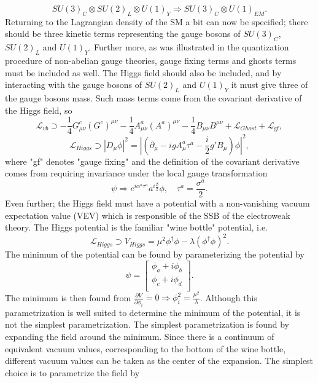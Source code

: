 \begin{equation}
	SU(3)_{C}\otimes SU(2)_L\otimes U(1)_Y\Rightarrow SU(3)_{C}\otimes U(1)_{EM}.
\end{equation} 
Returning to the Lagrangian density of the SM a bit can now be specified; there should be three kinetic terms representing the gauge bosons of $SU(3)_{C}$, $SU(2)_L$ and $U(1)_Y$. Further more, as was illustrated in the quantization procedure of non-abelian gauge theories, gauge fixing terms and ghosts terms must be included as well. The Higgs field should also be included, and by interacting with the gauge bosons of $SU(2)_L$ and $U(1)_Y$ it must give three of the gauge bosons mass. Such mass terms come from the covariant derivative of the Higgs field, so
\begin{equation}
	\mathcal{L}_{vb}\supset -\frac{1}{4}G^c_{\mu\nu}(G^c)^{\mu\nu}-\frac{1}{4}A^a_{\mu\nu}(A^a)^{\mu\nu}-\frac{1}{4}B_{\mu\nu}B^{\mu\nu}+\mathcal{L}_{Ghost}+\mathcal{L}_{\text{gf}},
\end{equation} 
\begin{equation}
	\mathcal{L}_{Higgs}\supset |D_\mu\phi|^2=|(\partial_\mu-igA_\mu^a\tau^a-\frac{i}{2}g'B_\mu)\phi|^2,
\end{equation} 
where "gf" denotes "gauge fixing" and the definition of the covariant derivative comes from requiring invariance under the local gauge transformation
\begin{equation}
	\psi\Rightarrow e^{i\alpha^a\tau^a}a^{i\frac{\beta}{2}}\phi, \quad \tau^a=\frac{\sigma^a}{2}.
\end{equation}  
Even further; the Higgs field must have a potential with a non-vanishing vacuum expectation value (VEV) which is responsible of the SSB of the electroweak theory. The Higgs potential is the familiar "wine bottle" potential, i.e.
\begin{equation}
	\mathcal{L}_{Higgs}\supset V_{Higgs}=\mu^2\phi^\dagger\phi-\lambda(\phi^\dagger\phi)^2.
\end{equation} 
The minimum of the potential can be found by parameterizing the potential by
\begin{equation}
	\psi=\begin{bmatrix}
		\phi_a+i\phi_b\\
		\phi_c+i\phi_d\\
	\end{bmatrix}.
\end{equation} 
The minimum is then found from $\frac{\partial V}{\partial\phi_i}=0\Rightarrow \phi_i^2=\frac{\mu^2}{\lambda}$. Although this parametrization is well suited to determine the minimum of the potential, it is not the simplest parametrization. The simplest parametrization is found by expanding the field around the minimum. Since there is a continuum of equivalent vacuum values, corresponding to the bottom of the wine bottle, different vacuum values can be taken as the center of the expansion. The simplest choice is to parametrize the field by
